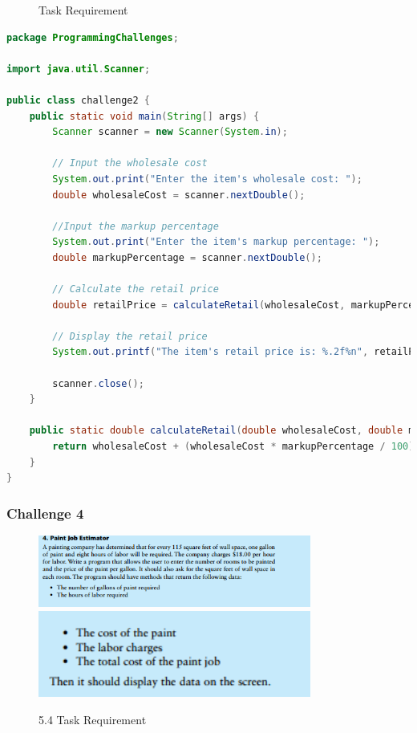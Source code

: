 \documentclass{article}
\begin{document}
\begin{figure}[h]
    \centering
    \caption{Task Requirement}
\end{figure}

\begin{lstlisting}[language=Java, caption=Challenge2.java]
package ProgrammingChallenges;

import java.util.Scanner;

public class challenge2 {
    public static void main(String[] args) {
        Scanner scanner = new Scanner(System.in);

        // Input the wholesale cost
        System.out.print("Enter the item's wholesale cost: ");
        double wholesaleCost = scanner.nextDouble();

        //Input the markup percentage
        System.out.print("Enter the item's markup percentage: ");
        double markupPercentage = scanner.nextDouble();

        // Calculate the retail price
        double retailPrice = calculateRetail(wholesaleCost, markupPercentage);

        // Display the retail price
        System.out.printf("The item's retail price is: %.2f%n", retailPrice);

        scanner.close();
    }

    public static double calculateRetail(double wholesaleCost, double markupPercentage) {
        return wholesaleCost + (wholesaleCost * markupPercentage / 100);
    }
}
\end{lstlisting}

\subsubsection*{Challenge 4}
\begin{figure}[H]
    \centering
    \includegraphics[width=0.8\textwidth]{./Assets/Task requirements/Assignment5/5.4.1.png}
    \includegraphics[width=0.8\textwidth]{./Assets/Task requirements/Assignment5/5.4.2.png}
    \caption{5.4 Task Requirement}
\end{figure}
\end{document}
